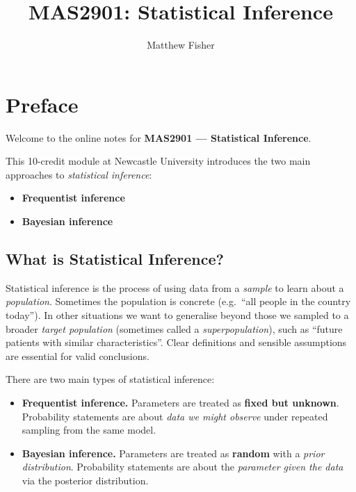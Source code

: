 \documentclass[
  letterpaper,
  DIV=11,
  numbers=noendperiod]{scrreprt}
\title{MAS2901: Statistical Inference}
\author{Matthew Fisher}
\date{}
\providecommand{\tightlist}{%
  \setlength{\itemsep}{0pt}\setlength{\parskip}{0pt}}
\renewcommand*\contentsname{Table of contents}
\newcommand\contentsname{Table of contents}
\theoremstyle{definition}
\theoremstyle{plain}
\theoremstyle{definition}
\theoremstyle{remark}
\begin{document}
\maketitle

\renewcommand*\contentsname{Table of contents}
{
\hypersetup{linkcolor=}
\setcounter{tocdepth}{2}
\tableofcontents
}


\chapter*{Preface}\label{preface}


Welcome to the online notes for \textbf{MAS2901 --- Statistical
Inference}.

This 10-credit module at Newcastle University introduces the two main
approaches to \emph{statistical inference}:

\begin{itemize}
\tightlist
\item
  \textbf{Frequentist inference}
\item
  \textbf{Bayesian inference}
\end{itemize}

\section*{What is Statistical
Inference?}\label{what-is-statistical-inference}


Statistical inference is the process of using data from a \emph{sample}
to learn about a \emph{population}. Sometimes the population is concrete
(e.g.~``all people in the country today''). In other situations we want
to generalise beyond those we sampled to a broader \emph{target
population} (sometimes called a \emph{superpopulation}), such as
``future patients with similar characteristics''. Clear definitions and
sensible assumptions are essential for valid conclusions.

There are two main types of statistical inference:

\begin{itemize}
\tightlist
\item
  \textbf{Frequentist inference.} Parameters are treated as
  \textbf{fixed but unknown}. Probability statements are about
  \emph{data we might observe} under repeated sampling from the same
  model.
\item
  \textbf{Bayesian inference.} Parameters are treated as \textbf{random}
  with a \emph{prior distribution}. Probability statements are about the
  \emph{parameter given the data} via the posterior distribution.
\end{itemize}
\end{document}
